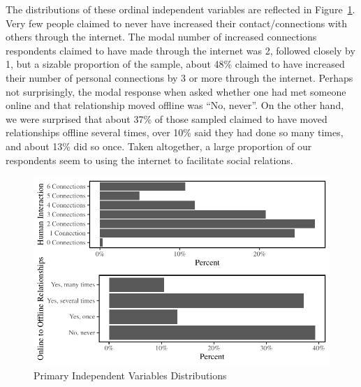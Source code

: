 \documentclass[]{interact}
\theoremstyle{plain}%
\theoremstyle{definition}
\theoremstyle{remark}
\begin{document}
The distributions of these ordinal independent variables are reflected
in Figure~\ref{fig-var-dist}. Very few people claimed to never have
increased their contact/connections with others through the internet.
The modal number of increased connections respondents claimed to have
made through the internet was 2, followed closely by 1, but a sizable
proportion of the sample, about 48\% claimed to have increased their
number of personal connections by 3 or more through the internet.
Perhaps not surprisingly, the modal response when asked whether one had
met someone online and that relationship moved offline was ``No,
never''. On the other hand, we were surprised that about 37\% of those
sampled claimed to have moved relationships offline several times, over
10\% said they had done so many times, and about 13\% did so once. Taken
altogether, a large proportion of our respondents seem to using the
internet to facilitate social relations.

\begin{figure}

{\centering \includegraphics{Social-Isolation-in-China_files/figure-pdf/fig-var-dist-1.pdf}

}

\caption{\label{fig-var-dist}Primary Independent Variables
Distributions}

\end{figure}
\end{document}
